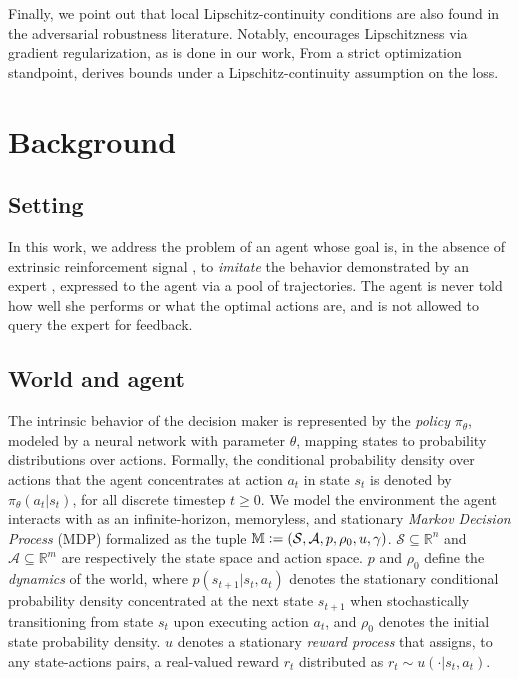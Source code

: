Finally, we point out that local Lipschitz-continuity conditions are
also found in the adversarial robustness literature.
Notably, \cite{Finlay2018-is} encourages Lipschitzness via gradient regularization, as is done in our work,
From a strict optimization standpoint, \cite{Hardt2015-qf}
derives bounds under a Lipschitz-continuity assumption on the loss.

\section{Background}

\subsection*{Setting}

In this work, we address the problem of an agent whose goal is,
in the absence of extrinsic reinforcement signal \cite{Singh2009-cm},
to \emph{imitate} the behavior demonstrated by an expert \cite{Bagnell2015-ni},
expressed to the agent via a pool of trajectories.
The agent is never told how well she performs or what the optimal actions are,
and is not allowed to query the expert for feedback.

\subsection*{World and agent}
\label{prelim}

The intrinsic behavior of the decision maker is represented by the \emph{policy} $\pi_\theta$,
modeled by a neural network with parameter $\theta$,
mapping states to probability distributions over actions.
Formally, the conditional probability density over actions that the agent
concentrates at action $a_t$ in state $s_t$ is denoted by $\pi_\theta(a_t | s_t)$,
for all discrete timestep $t \geq 0$.
We model the environment the agent interacts with as an infinite-horizon, memoryless, and stationary
\emph{Markov Decision Process} (MDP) \cite{Puterman1994-pf}
formalized as the tuple
$\mathbb{M} \vcentcolon= (\mathcal{S}, \mathcal{A}, p, \rho_0, u, \gamma)$.
$\mathcal{S} \subseteq \mathbb{R}^n$ and $\mathcal{A} \subseteq \mathbb{R}^m$
are respectively the state space and action space.
$p$ and $\rho_0$ define the \emph{dynamics} of the world,
where $p(s_{t+1} | s_t, a_t)$ denotes the stationary conditional probability density
concentrated at the next state $s_{t+1}$
when stochastically transitioning from state $s_t$ upon executing action $a_t$,
and $\rho_0$ denotes the initial state probability density.
$u$ denotes a stationary \emph{reward process}
that assigns, to any state-actions pairs,
a real-valued reward $r_t$ distributed as $r_t \sim u(\cdot | s_t, a_t)$.

